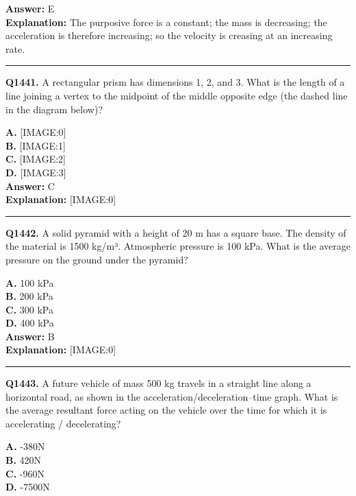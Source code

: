 \documentclass[12pt]{article}
\begin{document}
\textbf{Answer:} E \\
\textbf{Explanation:} The purposive force is a constant; the mass is decreasing; the acceleration is therefore increasing; so the velocity is creasing at an increasing rate.

\hrule
\vspace{1em}


\noindent
\textbf{Q1441.} A rectangular prism has dimensions 1, 2, and 3. What is the length of a line joining a vertex to the midpoint of the middle opposite edge (the dashed line in the diagram below)?



\textbf{A.} [IMAGE:0] \\
\textbf{B.} [IMAGE:1] \\
\textbf{C.} [IMAGE:2] \\
\textbf{D.} [IMAGE:3] \\

\textbf{Answer:} C \\
\textbf{Explanation:} [IMAGE:0]

\hrule
\vspace{1em}


\noindent
\textbf{Q1442.} A solid pyramid with a height of 20 m has a square base. The density of the material is 1500 kg/m³. Atmospheric pressure is 100 kPa. What is the average pressure on the ground under the pyramid?



\textbf{A.} 100 kPa \\
\textbf{B.} 200 kPa \\
\textbf{C.} 300 kPa \\
\textbf{D.} 400 kPa \\

\textbf{Answer:} B \\
\textbf{Explanation:} [IMAGE:0]

\hrule
\vspace{1em}


\noindent
\textbf{Q1443.} A future vehicle of mass 500 kg travels in a straight line along a horizontal road, as shown in the acceleration/deceleration–time graph.
What is the average resultant force acting on the vehicle over the time for which it is accelerating / decelerating?



\textbf{A.} -380N \\
\textbf{B.} 420N \\
\textbf{C.} -960N \\
\textbf{D.} -7500N \\
\end{document}
